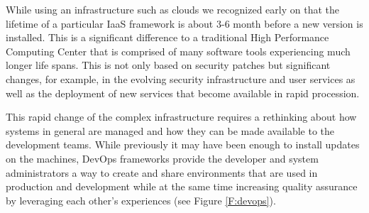\documentclass[graybox]{svmult}
\begin{document}
While using an infrastructure such as clouds we recognized early on that the lifetime of a particular IaaS framework is about 3-6 month before a new version is installed. This is a significant difference to a traditional High Performance Computing Center that is comprised of many software tools experiencing much longer life spans. This is not only based on security patches but significant changes, for example, in the evolving security infrastructure and  user services as well as the deployment of new services that become available in rapid procession.


This rapid change of the complex infrastructure requires a rethinking about how systems in general are managed and how they can be made available to the development teams. While previously it may have been enough to install updates on the machines, DevOps frameworks provide the developer and system administrators a way to create and share environments that are used in production and development while at the same time increasing quality assurance by leveraging each other’s experiences (see Figure \ref{F:devops}).
\end{document}
